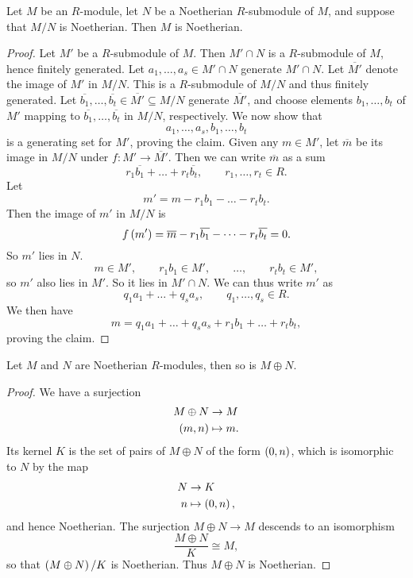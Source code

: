 \begin{proposition}
Let $ M $ be an $ R $-module, let $ N $ be a Noetherian $ R $-submodule of $ M $, and suppose that $ M / N $ is Noetherian. Then $ M $ is Noetherian.
\end{proposition}

\begin{proof}
Let $ M' $ be a $ R $-submodule of $ M $. Then $ M' \cap N $ is a $ R $-submodule of $ M $, hence finitely generated. Let $ a_1, \dots, a_s \in M' \cap N $ generate $ M' \cap N $. Let $ \overline{M'} $ denote the image of $ M' $ in $ M / N $. This is a $ R $-submodule of $ M / N $ and thus finitely generated. Let $ \overline{b_1}, \dots, \overline{b_t} \in \overline{M'} \subseteq M / N $ generate $ \overline{M'} $, and choose elements $ b_1, \dots, b_t $ of $ M' $ mapping to $ \overline{b_1}, \dots, \overline{b_t} $ in $ M / N $, respectively. We now show that
$$ a_1, \dots, a_s, b_1, \dots, b_t $$
is a generating set for $ M' $, proving the claim. Given any $ m \in M' $, let $ \overline{m} $ be its image in $ M / N $ under $ f : M' \to \overline{M'} $. Then we can write $ \overline{m} $ as a sum
$$ r_1\overline{b_1} + \dots + r_t\overline{b_t}, \qquad r_1, \dots, r_t \in R. $$
Let
$$ m' = m - r_1b_1 - \dots - r_tb_t. $$
Then the image of $ m' $ in $ M / N $ is
$$ f\left( m' \right) = \overline{m} - r_1\overline{b_1} - \dots - r_t\overline{b_t} = 0. $$
So $ m' $ lies in $ N $.
$$ m \in M', \qquad r_1b_1 \in M', \qquad \dots, \qquad r_tb_t \in M', $$
so $ m' $ also lies in $ M' $. So it lies in $ M' \cap N $. We can thus write $ m' $ as
$$ q_1a_1 + \dots + q_sa_s, \qquad q_1, \dots, q_s \in R. $$
We then have
$$ m = q_1a_1 + \dots + q_sa_s + r_1b_1 + \dots + r_tb_t, $$
proving the claim.
\end{proof}

\begin{corollary}
Let $ M $ and $ N $ are Noetherian $ R $-modules, then so is $ M \oplus N $.
\end{corollary}

\begin{proof}
We have a surjection
\begin{align*}
M \oplus N & \to M \\
\left( m, n \right) & \mapsto m.
\end{align*}
Its kernel $ K $ is the set of pairs of $ M \oplus N $ of the form $ \left( 0, n \right) $, which is isomorphic to $ N $ by the map
\begin{align*}
N & \to K \\
n & \mapsto \left( 0, n \right),
\end{align*}
and hence Noetherian. The surjection $ M \oplus N \to M $ descends to an isomorphism
$$ \dfrac{M \oplus N}{K} \cong M, $$
so that $ \left( M \oplus N \right) / K $ is Noetherian. Thus $ M \oplus N $ is Noetherian.
\end{proof}

